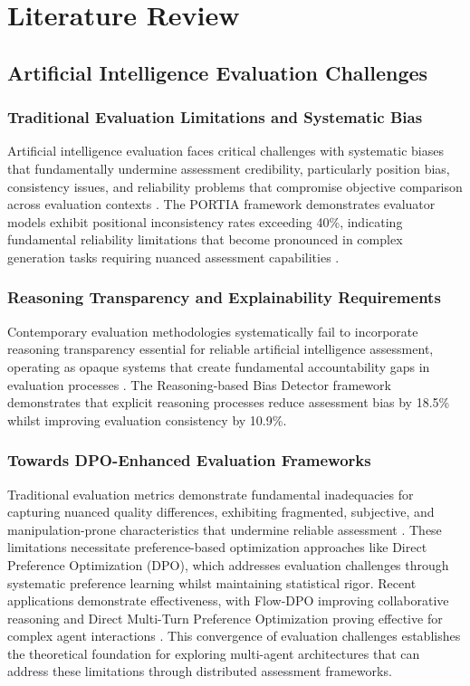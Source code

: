 
\chapter{Literature Review}

\section{Artificial Intelligence Evaluation Challenges}

\subsection{Traditional Evaluation Limitations and Systematic Bias}

Artificial intelligence evaluation faces critical challenges with systematic biases that fundamentally undermine assessment credibility, particularly position bias, consistency issues, and reliability problems that compromise objective comparison across evaluation contexts \cite{li2023position_bias_portia}. The PORTIA framework demonstrates evaluator models exhibit positional inconsistency rates exceeding 40\%, indicating fundamental reliability limitations that become pronounced in complex generation tasks requiring nuanced assessment capabilities \cite{li2023position_bias_portia}.

\subsection{Reasoning Transparency and Explainability Requirements}

Contemporary evaluation methodologies systematically fail to incorporate reasoning transparency essential for reliable artificial intelligence assessment, operating as opaque systems that create fundamental accountability gaps in evaluation processes \cite{yang2025reasoning_bias_detector}. The Reasoning-based Bias Detector framework demonstrates that explicit reasoning processes reduce assessment bias by 18.5\% whilst improving evaluation consistency by 10.9\%.

\subsection{Towards DPO-Enhanced Evaluation Frameworks}

Traditional evaluation metrics demonstrate fundamental inadequacies for capturing nuanced quality differences, exhibiting fragmented, subjective, and manipulation-prone characteristics that undermine reliable assessment \cite{seth2025xai_metrics_gap}. These limitations necessitate preference-based optimization approaches like Direct Preference Optimization (DPO), which addresses evaluation challenges through systematic preference learning whilst maintaining statistical rigor. Recent applications demonstrate effectiveness, with Flow-DPO improving collaborative reasoning \cite{deng2024flow_dpo} and Direct Multi-Turn Preference Optimization proving effective for complex agent interactions \cite{shi2024direct_multi_turn}. This convergence of evaluation challenges establishes the theoretical foundation for exploring multi-agent architectures that can address these limitations through distributed assessment frameworks.



